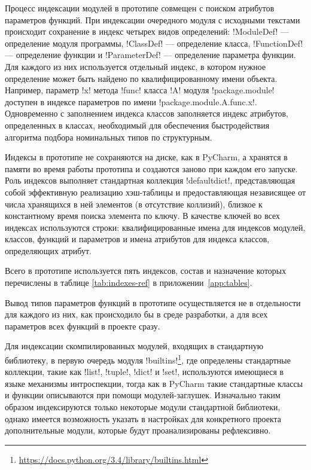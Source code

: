 Процесс индексации модулей в прототипе совмещен с поиском атрибутов параметров
функций. При индексации очередного модуля с исходными текстами происходит
сохранение в индекс четырех видов определений: !ModuleDef! --- определение
модуля программы, !ClassDef! --- определение класса, !FunctionDef! ---
определение функции и !ParameterDef! --- определение параметра функции. Для
каждого из них используется отдельный индекс, в котором нужное определение может
быть найдено по квалифицированному имени объекта. Например, параметр !x! метода
!func! класса !A! модуля !package.module! доступен в индексе параметров по имени
!package.module.A.func.x!. Одновременно с заполнением индекса классов
заполняется индекс атрибутов, определенных в классах, необходимый для
обеспечения быстродействия алгоритма подбора номинальных типов по структурным.

Индексы в прототипе не сохраняются на диске, как в PyCharm, а хранятся в
памяти во время работы прототипа и создаются заново при каждом его запуске. Роль
индексов выполняет стандартная коллекция !defaultdict!, представляющая собой
эффективную реализацию хэш-таблицы и предоставляющая независящее от числа
хранящихся в ней элементов (в отсутствие коллизий), близкое к константному
время поиска элемента по ключу. В качестве ключей во всех индексах используются
строки: квалифицированные имена для индексов модулей, классов, функций и
параметров и имена атрибутов для индекса классов, определяющих атрибут.

Всего в прототипе используется пять индексов, состав и назначение которых
перечислены в таблице \ref{tab:indexes-ref} в приложении~\ref{app:tables}.

Вывод типов параметров функций в прототипе осуществляется не в отдельности для
каждого из них, как происходило бы в среде разработки, а для всех параметров
всех функций в проекте сразу.


Для индексации скомпилированных модулей, входящих в стандартную библиотеку, в
первую очередь модуля
!builtins!\footnote{\url{https://docs.python.org/3.4/library/builtins.html}},
где определены стандартные коллекции, такие как !list!, !tuple!, !dict! и !set!,
используются имеющиеся в языке механизмы интроспекции, тогда как в PyCharm
такие стандартные классы и функции описываются при помощи модулей-заглушек.
Изначально таким образом индексируются только некоторые модули стандартной
библиотеки, однако имеется возможность указать в настройках для конкретного
проекта дополнительные модули, которые будут проанализированы рефлексивно.

